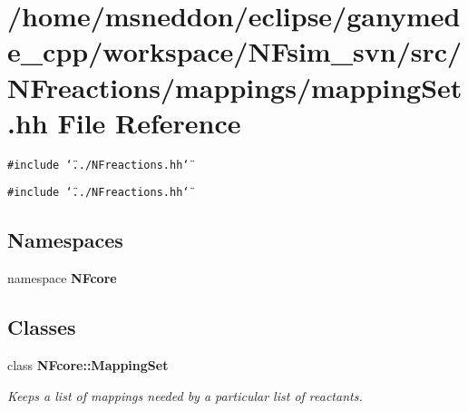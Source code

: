 \section{/home/msneddon/eclipse/ganymede\_\-cpp/workspace/NFsim\_\-svn/src/NFreactions/mappings/mappingSet.hh File Reference}
\label{mappingSet_8hh}


{\tt \#include \char`\"{}../NFreactions.hh\char`\"{}}\par
{\tt \#include \char`\"{}../NFreactions.hh\char`\"{}}\par
\subsection*{Namespaces}
\begin{CompactItemize}
\item 
namespace {\bf NFcore}
\end{CompactItemize}
\subsection*{Classes}
\begin{CompactItemize}
\item 
class {\bf NFcore::MappingSet}
\begin{CompactList}\small\item\em Keeps a list of mappings needed by a particular list of reactants. \item\end{CompactList}\end{CompactItemize}
